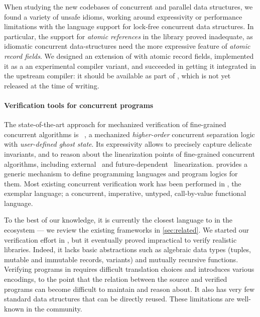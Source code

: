 When studying the new codebases of concurrent and parallel data structures, we found a variety of unsafe idioms, working around expressivity or performance limitations with the \OCaml language support for lock-free concurrent data structures.
In particular, the support for \emph{atomic references} in the \OCaml library proved inadequate, as idiomatic concurrent data-structures need the more expressive feature of \emph{atomic record fields}.
We designed an extension of \OCaml with atomic record fields, implemented it as a an experimental compiler variant, and succeeded in getting it integrated in the upstream \OCaml compiler: it should be available as part of , which is not yet released at the time of writing.

\paragraph{Verification tools for concurrent programs}

The state-of-the-art approach for mechanized verification of fine-grained concurrent algorithms is \Iris~\citep{DBLP:journals/jfp/JungKJBBD18}, a mechanized \emph{higher-order} concurrent separation logic with \emph{user-defined ghost state}.
Its expressivity allows to precisely capture delicate invariants, and to reason about the linearization points of fine-grained concurrent algorithms, including external~\citep{DBLP:conf/cpp/VindumFB22} and future-dependent~\citep{DBLP:journals/pacmpl/JungLPRTDJ20,DBLP:conf/cpp/VindumB21,DBLP:conf/osdi/Chang0STKZ23} linearization.
\Iris provides a generic mechanism to define programming languages and program logics for them. Most existing \Iris concurrent verification work has been performed in \HeapLang, the exemplar \Iris language; a concurrent, imperative, untyped, call-by-value functional language.

To the best of our knowledge, it is currently the closest language to \OCamlFive in the \Iris ecosystem --- we review the existing frameworks in \cref{sec:related}.
We started our verification effort in \HeapLang, but it eventually proved impractical to verify realistic \OCaml libraries.
Indeed, it lacks basic abstractions such as algebraic data types (tuples, mutable and immutable records, variants) and mutually recursive functions.
Verifying \OCaml programs in \HeapLang requires difficult translation choices and introduces various encodings, to the point that the relation between the source and verified programs can become difficult to maintain and reason about.
It also has very few standard data structures that can be directly reused.
These limitations are well-known in the \Iris community.

